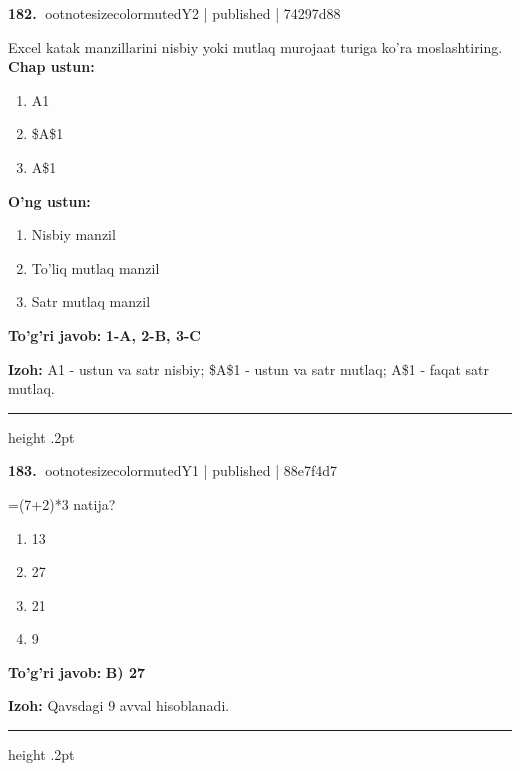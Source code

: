\documentclass[10pt,a4paper]{article}
\begin{document}
\textbf{\color{ink}182.} {ootnotesizecolor{muted}Y2 | published | 74297d88}
\par
Excel katak manzillarini nisbiy yoki mutlaq murojaat turiga ko'ra moslashtiring.
\textbf{Chap ustun:}\begin{enumerate}[label=\arabic*),leftmargin=9mm]
\item A1
\item \$A\$1
\item A\$1
\end{enumerate}
\textbf{O'ng ustun:}\begin{enumerate}[label=\Alph*),leftmargin=9mm]
\item Nisbiy manzil
\item To'liq mutlaq manzil
\item Satr mutlaq manzil
\end{enumerate}
\begin{tcolorbox}[enhanced,breakable,colback=teal!4,colframe=teal!55!black,boxrule=0.45pt,arc=1.2mm,left=2.8mm,right=2.8mm,top=2mm,bottom=2mm]
\textbf{\color{teal}To'g'ri javob:} \textbf{1-A, 2-B, 3-C}
\par\smallskip
\textbf{Izoh:} A1 - ustun va satr nisbiy; \$A\$1 - ustun va satr mutlaq; A\$1 - faqat satr mutlaq.
\end{tcolorbox}
\vspace{2mm}\hrule height .2pt\vspace{2mm}

\textbf{\color{ink}183.} {ootnotesizecolor{muted}Y1 | published | 88e7f4d7}
\par
=(7+2)*3 natija?
\begin{enumerate}[label=\Alph*),leftmargin=9mm]
\item 13
\item 27
\item 21
\item 9
\end{enumerate}
\begin{tcolorbox}[enhanced,breakable,colback=teal!4,colframe=teal!55!black,boxrule=0.45pt,arc=1.2mm,left=2.8mm,right=2.8mm,top=2mm,bottom=2mm]
\textbf{\color{teal}To'g'ri javob:} \textbf{B) 27}
\par\smallskip
\textbf{Izoh:} Qavsdagi 9 avval hisoblanadi.
\end{tcolorbox}
\vspace{2mm}\hrule height .2pt\vspace{2mm}
\end{document}
